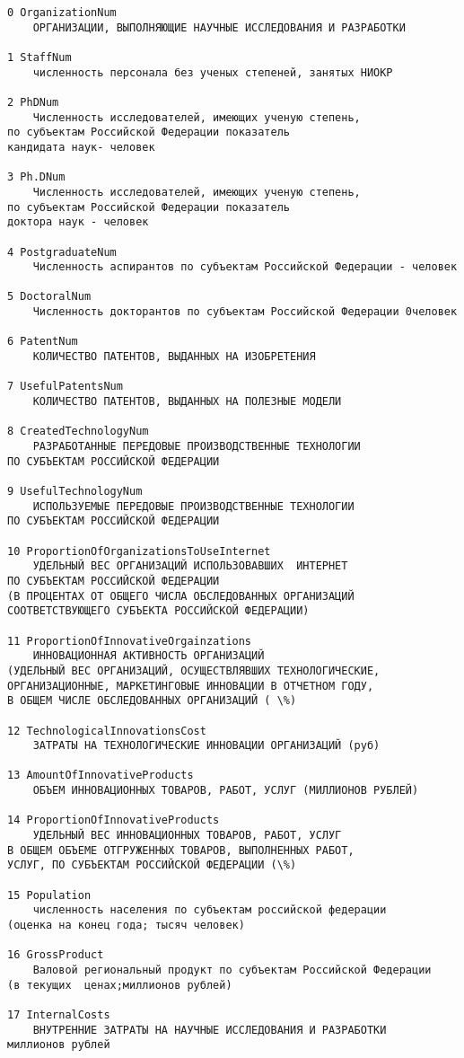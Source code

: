 \documentclass[11pt]{article}
\begin{document}
    \begin{Verbatim}[commandchars=\\\{\}]
0 OrganizationNum
	ОРГАНИЗАЦИИ, ВЫПОЛНЯЮЩИЕ НАУЧНЫЕ ИССЛЕДОВАНИЯ И РАЗРАБОТКИ

1 StaffNum
	численность персонала без ученых степеней, занятых НИОКР

2 PhDNum
	Численность исследователей, имеющих ученую степень,
по субъектам Российской Федерации показатель
кандидата наук- человек

3 Ph.DNum
	Численность исследователей, имеющих ученую степень,
по субъектам Российской Федерации показатель
доктора наук - человек

4 PostgraduateNum
	Численность аспирантов по субъектам Российской Федерации - человек

5 DoctoralNum
	Численность докторантов по субъектам Российской Федерации 0человек

6 PatentNum
	КОЛИЧЕСТВО ПАТЕНТОВ, ВЫДАННЫХ НА ИЗОБРЕТЕНИЯ

7 UsefulPatentsNum
	КОЛИЧЕСТВО ПАТЕНТОВ, ВЫДАННЫХ НА ПОЛЕЗНЫЕ МОДЕЛИ

8 CreatedTechnologyNum
	РАЗРАБОТАННЫЕ ПЕРЕДОВЫЕ ПРОИЗВОДСТВЕННЫЕ ТЕХНОЛОГИИ
ПО СУБЪЕКТАМ РОССИЙСКОЙ ФЕДЕРАЦИИ

9 UsefulTechnologyNum
	ИСПОЛЬЗУЕМЫЕ ПЕРЕДОВЫЕ ПРОИЗВОДСТВЕННЫЕ ТЕХНОЛОГИИ
ПО СУБЪЕКТАМ РОССИЙСКОЙ ФЕДЕРАЦИИ

10 ProportionOfOrganizationsToUseInternet
	УДЕЛЬНЫЙ ВЕС ОРГАНИЗАЦИЙ ИСПОЛЬЗОВАВШИХ  ИНТЕРНЕТ
ПО СУБЪЕКТАМ РОССИЙСКОЙ ФЕДЕРАЦИИ
(В ПРОЦЕНТАХ ОТ ОБЩЕГО ЧИСЛА ОБСЛЕДОВАННЫХ ОРГАНИЗАЦИЙ
СООТВЕТСТВУЮЩЕГО СУБЪЕКТА РОССИЙСКОЙ ФЕДЕРАЦИИ)

11 ProportionOfInnovativeOrgainzations
	ИННОВАЦИОННАЯ АКТИВНОСТЬ ОРГАНИЗАЦИЙ
(УДЕЛЬНЫЙ ВЕС ОРГАНИЗАЦИЙ, ОСУЩЕСТВЛЯВШИХ ТЕХНОЛОГИЧЕСКИЕ,
ОРГАНИЗАЦИОННЫЕ, МАРКЕТИНГОВЫЕ ИННОВАЦИИ В ОТЧЕТНОМ ГОДУ,
В ОБЩЕМ ЧИСЛЕ ОБСЛЕДОВАННЫХ ОРГАНИЗАЦИЙ ( \%)

12 TechnologicalInnovationsCost
	ЗАТРАТЫ НА ТЕХНОЛОГИЧЕСКИЕ ИННОВАЦИИ ОРГАНИЗАЦИЙ (руб)

13 AmountOfInnovativeProducts
	ОБЪЕМ ИННОВАЦИОННЫХ ТОВАРОВ, РАБОТ, УСЛУГ (МИЛЛИОНОВ РУБЛЕЙ)

14 ProportionOfInnovativeProducts
	УДЕЛЬНЫЙ ВЕС ИННОВАЦИОННЫХ ТОВАРОВ, РАБОТ, УСЛУГ
В ОБЩЕМ ОБЪЕМЕ ОТГРУЖЕННЫХ ТОВАРОВ, ВЫПОЛНЕННЫХ РАБОТ,
УСЛУГ, ПО СУБЪЕКТАМ РОССИЙСКОЙ ФЕДЕРАЦИИ (\%)

15 Population
	численность населения по субъектам российской федерации
(оценка на конец года; тысяч человек)

16 GrossProduct
	Валовой региональный продукт по субъектам Российской Федерации
(в текущих  ценах;миллионов рублей)

17 InternalCosts
	ВНУТРЕННИЕ ЗАТРАТЫ НА НАУЧНЫЕ ИССЛЕДОВАНИЯ И РАЗРАБОТКИ
миллионов рублей


    \end{Verbatim}
\end{document}
